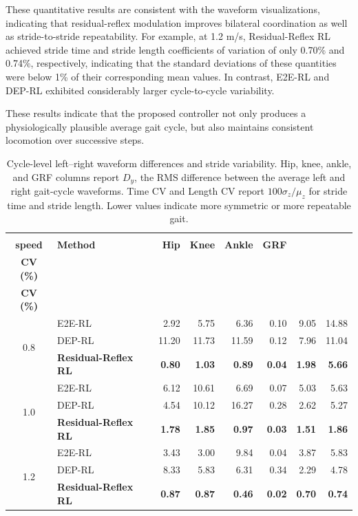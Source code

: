 \documentclass[manuscript,screen,review,anonymous]{acmart}
\begin{document}
These quantitative results are consistent with the waveform visualizations, indicating that residual-reflex modulation improves bilateral coordination as well as stride-to-stride repeatability. For example, at 1.2 m/s, Residual-Reflex RL achieved stride time and stride length coefficients of variation of only 0.70\% and 0.74\%, respectively, indicating that the standard deviations of these quantities were below 1\% of their corresponding mean values. In contrast, E2E-RL and DEP-RL exhibited considerably larger cycle-to-cycle variability.

These results indicate that the proposed controller not only produces a physiologically plausible average gait cycle, but also maintains consistent locomotion over successive steps.


\begin{table}[!t]
\centering
\caption{Cycle-level left--right waveform differences and stride variability.
Hip, knee, ankle, and GRF columns report $D_y$, the RMS difference between the
average left and right gait-cycle waveforms. Time CV and Length CV report
$100\sigma_z/\mu_z$ for stride time and stride length. Lower values indicate
more symmetric or more repeatable gait.}
\label{tab:symmetry_variability}
\small
\setlength{\tabcolsep}{3.5pt}
\renewcommand{\arraystretch}{1.12}
\begin{tabular}{c l r r r r r r}
\toprule
\makecell{\textbf{Target}\\\textbf{speed}} & \textbf{Method} & \textbf{Hip} & \textbf{Knee} & \textbf{Ankle} & \textbf{GRF} & \makecell{\textbf{Time}\\\textbf{CV (\%)}} & \makecell{\textbf{Length}\\\textbf{CV (\%)}} \\
\midrule
\multirow[c]{3}{*}{0.8} & E2E-RL & 2.92 & 5.75 & 6.36 & 0.10 & 9.05 & 14.88 \\
 & DEP-RL & 11.20 & 11.73 & 11.59 & 0.12 & 7.96 & 11.04 \\
 & \textbf{Residual-Reflex RL} & \textbf{0.80} & \textbf{1.03} & \textbf{0.89} & \textbf{0.04} & \textbf{1.98} & \textbf{5.66} \\
\midrule
\multirow[c]{3}{*}{1.0} & E2E-RL & 6.12 & 10.61 & 6.69 & 0.07 & 5.03 & 5.63 \\
 & DEP-RL & 4.54 & 10.12 & 16.27 & 0.28 & 2.62 & 5.27 \\
 & \textbf{Residual-Reflex RL} & \textbf{1.78} & \textbf{1.85} & \textbf{0.97} & \textbf{0.03} & \textbf{1.51} & \textbf{1.86} \\
\midrule
\multirow[c]{3}{*}{1.2} & E2E-RL & 3.43 & 3.00 & 9.84 & 0.04 & 3.87 & 5.83 \\
 & DEP-RL & 8.33 & 5.83 & 6.31 & 0.34 & 2.29 & 4.78 \\
 & \textbf{Residual-Reflex RL} & \textbf{0.87} & \textbf{0.87} & \textbf{0.46} & \textbf{0.02} & \textbf{0.70} & \textbf{0.74} \\
\bottomrule
\end{tabular}
\end{table}
\end{document}

